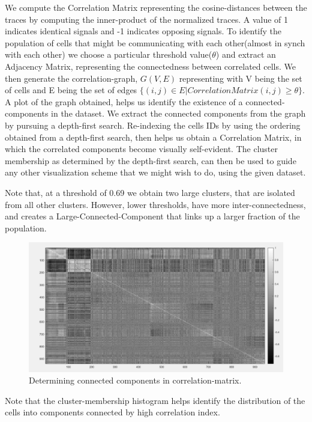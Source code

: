 \documentclass[10pt]{article}
\begin{document}
We compute the Correlation Matrix representing the cosine-distances between the traces by computing the inner-product of  the normalized traces. A value of 1 indicates identical signals and -1 indicates opposing signals. To identify the population of cells that might be communicating with each other(almost in synch with each other) we choose a particular threshold value($\theta$) and extract an Adjacency Matrix, representing the connectedness between correlated cells. 
We then generate the correlation-graph, $G(V,E)$ representing with V being the set of cells and E being the set of edges $\lbrace (i,j) \in E | CorrelationMatrix(i, j) \geq \theta  \rbrace$. A plot of the graph obtained, helps us identify the existence of a connected-components in the dataset. We extract the connected components from the graph by pursuing a depth-first search. Re-indexing the cells IDs by using the ordering obtained from a depth-first search, then helps us obtain a Correlation Matrix, in which the correlated components become visually self-evident. The cluster membership as determined by the depth-first search, can then be used to guide any other visualization scheme that we might wish to do, using the given dataset. 

Note that, at a threshold of 0.69 we obtain two large clusters, that are isolated from all other clusters. However, lower thresholds, have more inter-connectedness, and creates a Large-Connected-Component that links up a larger fraction of the population.
\begin{figure}[h!]
\centering
\includegraphics[scale=0.5]{components_CorrelationMatrix.png}
\caption{Determining connected components in correlation-matrix.}
\label{fig:correlationMatrix}
\end{figure}

Note that the cluster-membership histogram helps identify the distribution of the cells into components connected by high correlation index. 
\end{document}
